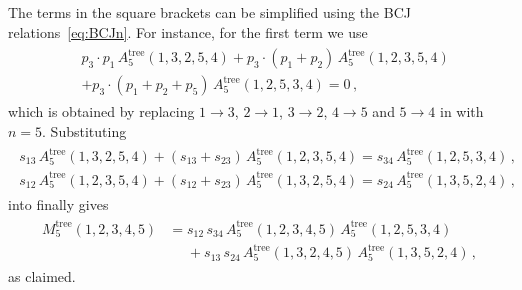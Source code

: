 The terms in the square brackets can be simplified using the BCJ relations~\eqref{eq:BCJn}. For instance, for the first term we use
\begin{align} \begin{aligned}
& p_3 \cdot p_1 \, A^{\text{tree}}_5(1,3,2,5,4) + p_3 \cdot (p_1+p_2) \, A^{\text{tree}}_5(1,2,3,5,4) \\
& +  p_3 \cdot (p_1+p_2+p_5) \, A^{\text{tree}}_5(1,2,5,3,4) = 0 \,,
\end{aligned} \end{align}
which is obtained by replacing $1\to 3$, $2\to 1$, $3\to 2$, $4 \to 5$ and $5 \to 4$ in  with $n=5$. Substituting
\begin{align} \begin{aligned}
s_{13} \, A^{\text{tree}}_5(1,3,2,5,4) + (s_{13}+s_{23}) \, A^{\text{tree}}_5(1,2,3,5,4)  = s_{34} \, A^{\text{tree}}_5(1,2,5,3,4) \,, \\
s_{12} \, A_5^{\text{tree}}(1,2,3,5,4) + (s_{12}+s_{23}) \, A_5^{\text{tree}}(1,3,2,5,4) =  s_{24} \, A_5^{\text{tree}}(1,3,5,2,4) \,,
\end{aligned} \end{align}
into  finally gives
\begin{align} \begin{aligned}
M_{5}^{\text{tree}}(1,2,3,4,5) & = s_{12} \, s_{34} \, A_5^{\text{tree}}(1,2,3,4,5) \, A^{\text{tree}}_5(1,2,5,3,4) \\
 & \phantom{{} =} + s_{13} \, s_{24} \, A_5^{\text{tree}}(1,3,2,4,5) \, A_5^{\text{tree}}(1,3,5,2,4) \,,
\end{aligned} \end{align}
as claimed.


